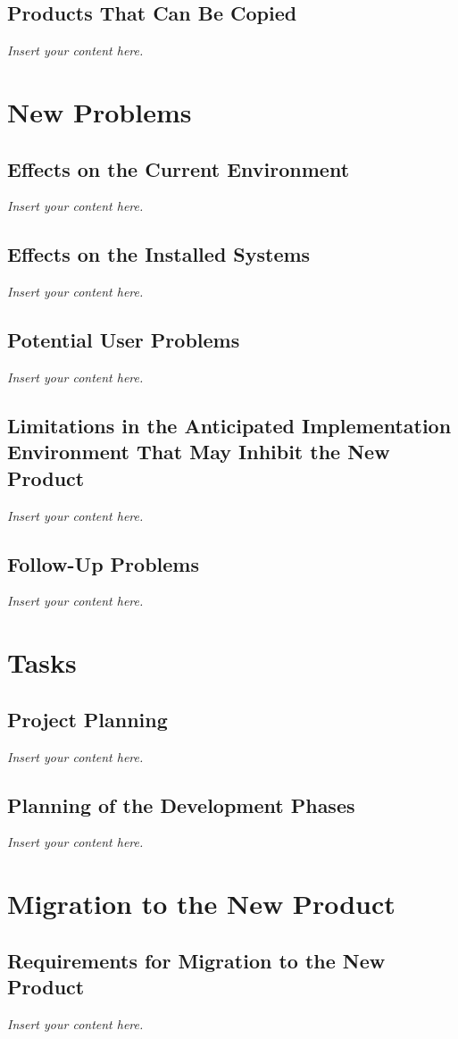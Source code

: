 \documentclass[12pt]{article}
\newcommand{\lips}{\textit{Insert your content here.}}
\begin{document}
\subsection{Products That Can Be Copied}
\lips

\section{New Problems}
\subsection{Effects on the Current Environment}
\lips
\subsection{Effects on the Installed Systems}
\lips
\subsection{Potential User Problems}
\lips
\subsection{Limitations in the Anticipated Implementation Environment That May
  Inhibit the New Product}
\lips
\subsection{Follow-Up Problems}
\lips

\section{Tasks}
\subsection{Project Planning}
\lips
\subsection{Planning of the Development Phases}
\lips

\section{Migration to the New Product}
\subsection{Requirements for Migration to the New Product}
\lips
\end{document}
